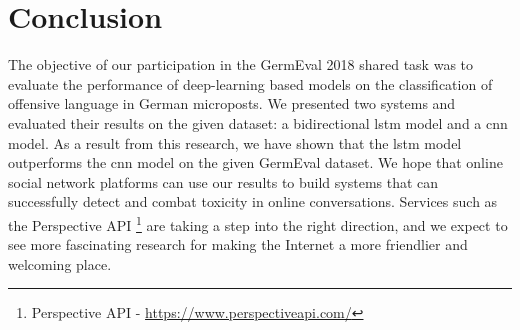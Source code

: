 \documentclass[11pt]{article}
\begin{document}
\section{Conclusion}
The objective of our participation in the GermEval 2018 shared task was to evaluate the performance of deep-learning based models on the classification of offensive language in German microposts. We presented two systems and evaluated their results on the given dataset: a bidirectional \ac{lstm} model and a \ac{cnn} model. As a result from this research, we have shown that the \ac{lstm} model outperforms the \ac{cnn} model on the given GermEval dataset. 
\newline
We hope that online social network platforms can use our results to build systems that can successfully detect and combat toxicity in online conversations. Services such as the Perspective API \footnote{Perspective API - \url{https://www.perspectiveapi.com/}} are taking a step into the right direction, and we expect to see more fascinating research for making the Internet a more friendlier and welcoming place.


\end{document}
